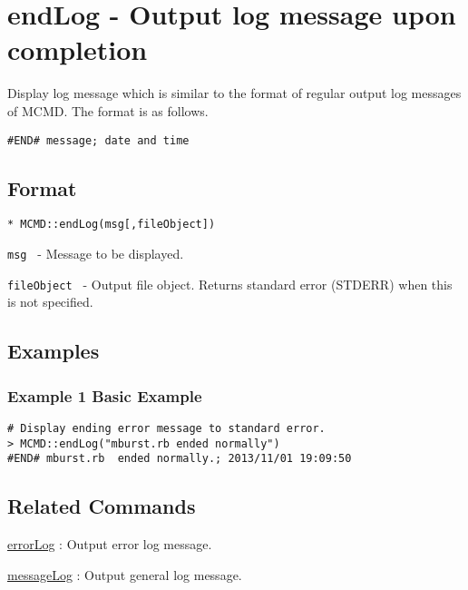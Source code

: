 
%

\section{endLog - Output log message upon completion \label{sect:endLog}}
Display log message which is similar to the format of regular output log messages of MCMD. The format is as follows.

\begin{Verbatim}[baselinestretch=0.7,frame=single]
#END# message; date and time
\end{Verbatim}


\subsection{Format}

{\Large
\begin{verbatim}
* MCMD::endLog(msg[,fileObject])
\end{verbatim}
} 

\begin{description}
	\setlength{\itemindent}{-5mm}
	\item {\large \verb/msg /} - Message to be displayed. 
	\item {\large \verb/fileObject /} - Output file object. Returns standard error (STDERR) when this is not specified.
\end{description}

\subsection{Examples}
\subsubsection*{Example 1 Basic Example }

\begin{Verbatim}[baselinestretch=0.7,frame=single]
# Display ending error message to standard error. 
> MCMD::endLog("mburst.rb ended normally")
#END# mburst.rb  ended normally.; 2013/11/01 19:09:50
\end{Verbatim}

\subsection{Related Commands}
\hyperref[sect:errorLogRB]{errorLog} : Output error log message.

\hyperref[sect:messageRB]{messageLog} :  Output general log message.

%

